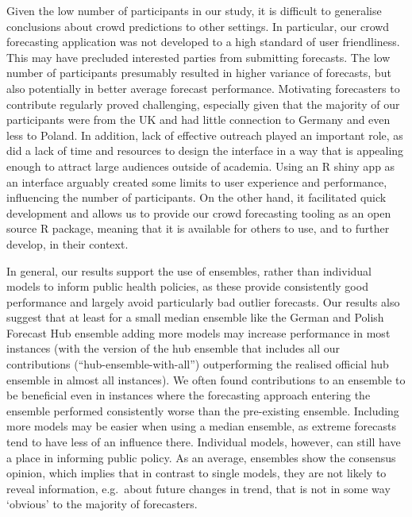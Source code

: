 \documentclass[
]{article}
\begin{document}
Given the low number of participants in our study, it is difficult to generalise conclusions about crowd predictions to other settings. In particular, our crowd forecasting application was not developed to a high standard of user friendliness. This may have precluded interested parties from submitting forecasts. The low number of participants presumably resulted in higher variance of forecasts, but also potentially in better average forecast performance. Motivating forecasters to contribute regularly proved challenging, especially given that the majority of our participants were from the UK and had little connection to Germany and even less to Poland. In addition, lack of effective outreach played an important role, as did a lack of time and resources to design the interface in a way that is appealing enough to attract large audiences outside of academia. Using an R shiny app as an interface arguably created some limits to user experience and performance, influencing the number of participants. On the other hand, it facilitated quick development and allows us to provide our crowd forecasting tooling as an open source R package, meaning that it is available for others to use, and to further develop, in their context.

In general, our results support the use of ensembles, rather than individual models to inform public health policies, as these provide consistently good performance and largely avoid particularly bad outlier forecasts. Our results also suggest that at least for a small median ensemble like the German and Polish Forecast Hub ensemble adding more models may increase performance in most instances (with the version of the hub ensemble that includes all our contributions (``hub-ensemble-with-all'') outperforming the realised official hub ensemble in almost all instances). We often found contributions to an ensemble to be beneficial even in instances where the forecasting approach entering the ensemble performed consistently worse than the pre-existing ensemble. Including more models may be easier when using a median ensemble, as extreme forecasts tend to have less of an influence there. Individual models, however, can still have a place in informing public policy. As an average, ensembles show the consensus opinion, which implies that in contrast to single models, they are not likely to reveal information, e.g.~about future changes in trend, that is not in some way `obvious' to the majority of forecasters.
\end{document}

